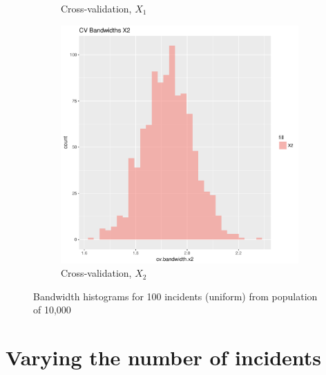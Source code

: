 \begin{figure}[htbp]
\begin{subfigure}[b]{0.3\textwidth}
    \caption{Cross-validation, \(X_1\)}
    \label{fig:bandwidths_x1:unif_100_unif:x1}
    \end{subfigure}
    \begin{subfigure}[b]{0.3\textwidth}
    \includegraphics[width=\textwidth]{results/unif_100_unif/output/bandwidths-x2}
    \caption{Cross-validation, \(X_2\)}
    \label{fig:bandwidths_x1:unif_100_unif:x2}
    \end{subfigure}
    \caption{Bandwidth histograms for 100 incidents (uniform) from population of 10,000}
\end{figure}


\section{Varying the number of incidents}
\label{sec:results:unif_NCases_1h}

